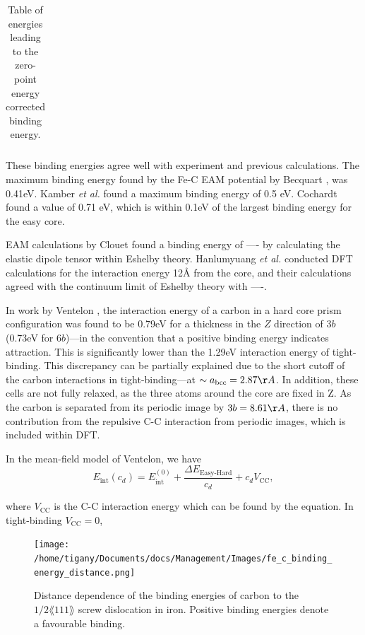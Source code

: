 \documentclass[a4paper,11pt]{article}
\begin{document}
{\begin{table}
\begin{tabular}{cccccc}
    \end{tabular}		
    \caption{Table of energies leading to the zero-point energy corrected binding energy. }
\end{table}

These binding energies agree well with experiment and previous
calculations. The maximum binding energy found by the Fe-C EAM
potential by Becquart \cite{Becquart2007}, was 0.41eV. Kamber
\emph{et al.} found a maximum binding energy of 0.5 eV. Cochardt
found a value of 0.71 eV, which is within 0.1eV of the largest
binding energy for the easy core. 

EAM calculations by Clouet \cite{Clouet2008} found a binding energy of ---- by calculating the
elastic dipole tensor within Eshelby theory. 
Hanlumyuang \emph{et al.} \cite{Hanlumyuang2010} conducted DFT calculations for the interaction energy 12\AA{} from the core,
and their calculations agreed with the continuum limit of Eshelby theory with ----. 


In work by Ventelon \cite{Ventelon2015}, the interaction energy of a carbon in a hard
core prism configuration was found to be 0.79eV for a thickness in the \(Z\) direction of 3\(b\) (0.73eV for \(6b\))---in the
convention that a positive binding energy indicates attraction. This is significantly lower than
the 1.29eV interaction energy of tight-binding. This discrepancy can be
partially explained due to the short cutoff of the carbon interactions in tight-binding---at
\(\sim a_{\text{bcc}} = 2.87 \AA\). In addition, these cells are not fully relaxed, as the three
atoms around the core are fixed in Z. As the carbon is separated from its periodic image by \(3b =
    8.61\AA\), there is no contribution from the repulsive C-C interaction from periodic images,
which is included within DFT.


In the mean-field model of Ventelon, we have
\[ E_{\text{int}}( c_d ) = E^{(0)}_{\text{int}} + \frac{\Delta E_{\text{Easy-Hard}}}{c_d} + c_d V_{\text{CC}} , \]

where \(V_{\text{CC}}\) is the C-C interaction energy which can be found by the equation. In
tight-binding \(V_{\text{CC}}= 0\), 



\begin{figure}[htbp]
\centering
\texttt{[image: /home/tigany/Documents/docs/Management/Images/fe\_c\_binding\_energy\_distance.png]}
\caption{\label{fig:org5fbc94f}
Distance dependence of the binding energies of carbon to the \(1/2\lang111\rang\) screw dislocation in iron. Positive binding energies denote a favourable binding.}
\end{figure}


}
\end{document}
